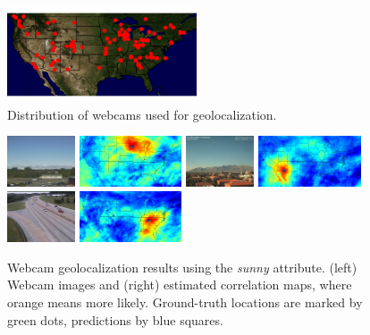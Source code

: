 \documentclass[10pt,twocolumn,letterpaper]{article}
\begin{document}
\begin{figure}[t]
	\centering
		\includegraphics[width=0.5\textwidth, trim= 0mm 5mm 0mm 0mm]{figs/geoloc/webcam_dist}
		\caption{Distribution of webcams used for geolocalization.}
		\label{fig:webcamdist}
\end{figure}

\begin{figure}
	\centering
		\includegraphics[width=0.18\textwidth]{figs/geoloc/297}
		\includegraphics[width=0.27\textwidth]{figs/geoloc/geoloc_8_297}
		\includegraphics[width=0.18\textwidth]{figs/geoloc/5207}
		\includegraphics[width=0.27\textwidth]{figs/geoloc/geoloc_24_5207}
		\includegraphics[width=0.18\textwidth]{figs/geoloc/23573}
		\includegraphics[width=0.27\textwidth]{figs/geoloc/geoloc_152_23573}
		\caption{Webcam geolocalization results using the
          \textit{sunny} attribute. (left) Webcam images and (right)
          estimated correlation maps, where orange 
          means more likely. Ground-truth locations are marked
          by green dots, predictions by blue squares.}
		\label{fig:geoloc}
\end{figure}
\end{document}
